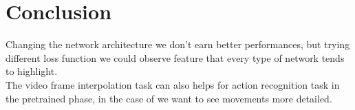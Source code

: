 \documentclass[11pt, a4paper]{article}
\begin{document}
	\section{Conclusion}
	Changing the network architecture we don't earn better performances, but trying different loss function we could observe feature that every type of network tends to highlight.\\ 
	The video frame interpolation task can also helps for action recognition task in the pretrained phase, in the case of we want to see movements more detailed.
	\clearpage
	
	
	
	
\end{document}
